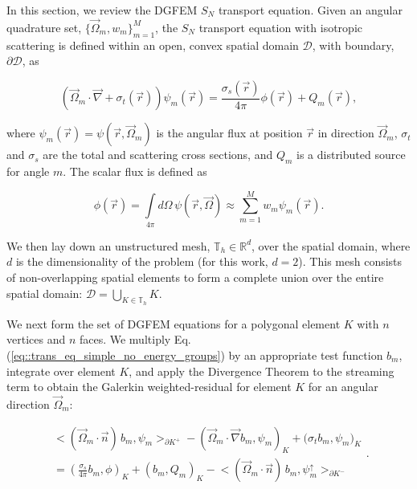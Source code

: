 \documentclass[preprint,10pt]{elsarticle}
\begin{document}
In this section, we review the DGFEM $S_N$ transport equation. Given an angular quadrature set, $\{  \vec{\Omega}_m, w_m \}_{m=1}^M$, the $S_N$ transport equation with isotropic scattering is defined within an open, convex spatial domain $\mathcal{D}$, with boundary, $\partial \mathcal{D}$, as

\begin{equation}
\label{eq::trans_eq_simple_no_energy_groups}
\left( \vec{\Omega}_m \cdot \vec{\nabla}  + \sigma_{t} (\vec{r}) \right)  \psi_{m} (\vec{r})=  \frac{\sigma_{s} (\vec{r})}{4 \pi}  \phi (\vec{r}) + Q_{m} (\vec{r}) ,
\end{equation}

\noindent where $\psi_{m} (\vec{r}) = \psi (\vec{r}, \vec{\Omega}_m)$ is the angular flux at position $\vec{r}$ in direction $\vec{\Omega}_m$, $\sigma_{t}$ and $\sigma_{s}$ are the total and scattering cross sections, and $Q_{m}$ is a distributed source for angle $m$. The scalar flux is defined as

\begin{equation}
\label{eq::scalar_flux_int}
\phi (\vec{r}) = \int\limits_{4 \pi} d \Omega \, \psi (\vec{r}, \vec{\Omega}) \approx \sum_{m=1}^{M} w_m \psi_{m} (\vec{r}) .
\end{equation}

\noindent We then lay down an unstructured mesh, $\mathbb{T}_h \in \mathbb{R}^{d}$, over the spatial domain, where $d$ is the dimensionality of the problem (for this work, $d=2$). This mesh consists of non-overlapping spatial elements to form a complete union over the entire spatial domain: $\mathcal{D} = \bigcup_{K \in \mathbb{T}_h} K$. 

We next form the set of DGFEM equations for a polygonal element $K$ with $n$ vertices and $n$ faces. We multiply Eq. (\ref{eq::trans_eq_simple_no_energy_groups}) by an appropriate test function $b_m$, integrate over element $K$, and apply the Divergence Theorem to the streaming term to obtain the Galerkin weighted-residual for element $K$ for an angular direction $\vec{\Omega}_m$:

\begin{equation}
\label{eq::DGFEM_trans_eq_cellK}
\begin{aligned}
 \Big< ( \vec{\Omega}_m \cdot \vec{n} ) \, b_m, \psi_m  \Big>_{\partial K^+} - \left( \vec{\Omega}_m \cdot  \vec{\nabla} b_m, \psi_{m} \right)_{K}  + \Big(  \sigma_{t} b_m ,   \psi_{m} \Big)_{K} \\
=  \left( \frac{\sigma_s}{4 \pi} b_m ,   \phi \right)_{K} + \left(  b_m ,   Q_{m} \right)_{K} -  \Big< ( \vec{\Omega}_m \cdot \vec{n} ) \, b_m, \psi^{\uparrow}_{m}  \Big>_{\partial K^-}
\end{aligned} .
\end{equation}
\end{document}
